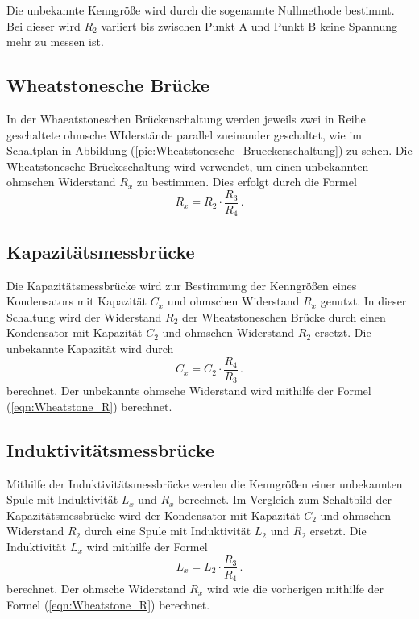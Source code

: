     Die unbekannte Kenngröße wird durch die sogenannte Nullmethode bestimmt. Bei dieser wird $R_2$ variiert bis zwischen Punkt A und Punkt B keine Spannung mehr zu
    messen ist. 
    \subsection{Wheatstonesche Brücke}
    In der Whaeatstoneschen Brückenschaltung werden jeweils zwei in Reihe geschaltete ohmsche WIderstände parallel zueinander geschaltet, wie im Schaltplan in Abbildung 
    (\ref{pic:Wheatstonesche_Brueckenschaltung}) zu sehen. 
    Die Wheatstonesche Brückeschaltung wird verwendet, um einen unbekannten ohmschen Widerstand $R_x$ zu bestimmen. Dies erfolgt durch die Formel 
    \begin{equation}
        \label{eqn:Wheatstone_R}
        R_x = R_2 \cdot \frac{R_3}{R_4} \,.
    \end{equation}
    \subsection{Kapazitätsmessbrücke}
    Die Kapazitätsmessbrücke wird zur Bestimmung der Kenngrößen eines Kondensators mit Kapazität $C_x$ und ohmschen Widerstand $R_x$ genutzt. In dieser Schaltung 
    wird der Widerstand $R_2$ der Wheatstoneschen Brücke durch einen Kondensator mit Kapazität $C_2$ und ohmschen Widerstand $R_2$ ersetzt. Die unbekannte Kapazität
    wird durch 
    \begin{equation}
        \label{eqn:Kapazitaet_C}
        C_x = C_2 \cdot \frac{R_4}{R_3} \,.
    \end{equation}
    berechnet. Der unbekannte ohmsche Widerstand wird mithilfe der Formel (\ref{eqn:Wheatstone_R})
    berechnet. 

    \subsection{Induktivitätsmessbrücke}
    Mithilfe der Induktivitätsmessbrücke werden die Kenngrößen einer unbekannten Spule mit Induktivität $L_x$ und $R_x$ berechnet. Im Vergleich zum Schaltbild der Kapazitätsmessbrücke
    wird der Kondensator mit Kapazität $C_2$ und ohmschen Widerstand $R_2$ durch eine Spule mit Induktivität $L_2$ und $R_2$ ersetzt. Die Induktivität $L_x$ wird 
    mithilfe der Formel 
    \begin{equation}
        \label{eqn:Induktivität_L}
        L_x = L_2 \cdot \frac{R_3}{R_4} \,.
    \end{equation}
    berechnet. Der ohmsche Widerstand $R_x$ wird wie die vorherigen mithilfe der Formel (\ref{eqn:Wheatstone_R}) berechnet. 
